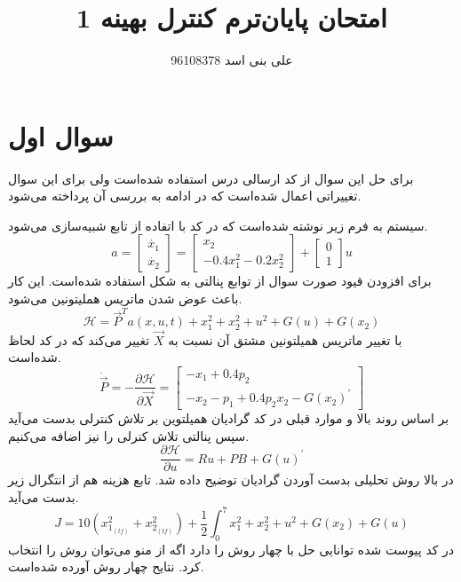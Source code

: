 \documentclass[12 pt]{article}
\title{امتحان پایان‌ترم کنترل بهینه 1}
\author{علی بنی اسد 96108378}
\begin{document}
	\maketitle
	\section*{سوال اول}
برای حل این سوال از کد ارسالی درس استفاده شده‌است ولی برای این سوال تغییراتی اعمال شده‌است که در ادامه به بررسی آن پرداخته می‌شود.


سیستم به فرم زیر نوشته شده‌‌است که در کد با اتفاده از تابع   شبیه‌سازی می‌شود.
$$
a = \begin{bmatrix}
	\dot{x_1}\\
	\dot{x_2}
\end{bmatrix} = \begin{bmatrix}
x_2\\
-0.4x_1^2 -0.2x_2^2
\end{bmatrix} + \begin{bmatrix}
0\\
1
\end{bmatrix}u
$$
برای افزودن قیود صورت سوال از توابع پنالتی به شکل 
استفاده شده‌است. این کار باعث عوض شدن ماتریس هملیتونین می‌شود.
$$
\mathcal{H} = \vec{P}^Ta(x, u, t) + x_1^2 + x_2^2 + u^2 + G(u) + G(x_2)
$$
با تغییر ماتریس همیلتونین مشتق آن نسبت به 
$\vec{X}$
 تغییر می‌کند که در کد لحاظ شده‌است.
 $$\dot{\vec{P}} = -\dfrac{\partial \mathcal{H}}{\partial \vec{X}} = \begin{bmatrix}
 	-x_1 + 0.4p_2 \\
 	-x_2  - p_1 + 0.4 p_2x_2 - G(x_2)^{\prime}
 \end{bmatrix}$$
بر اساس روند بالا و موارد قبلی در کد گرادیان همیلتوین بر تلاش کنترلی بدست می‌آید سپس پنالتی تلاش کنرلی را نیز اضافه می‌کنیم.
$$
\dfrac{\partial \mathcal{H}}{\partial u} = Ru + PB + G(u)^{\prime}
$$
در بالا روش تحلیلی بدست آوردن گرادیان توضیح داده شد.
تابع هزینه هم از انتگرال زیر بدست می‌آید.
$$J = 10(x_{1_{(tf)}}^2 + x_{2_{(tf)}}^2) +\frac{1}{2}\int_0^7 x_1^2 + x_2^2 + u^2 + G(x_2) + G(u)$$
در کد پیوست شده توانایی حل با چهار روش را دارد اگه از منو می‌توان روش را انتخاب کرد. نتایح چهار روش آورده شده‌است.
\end{document}
